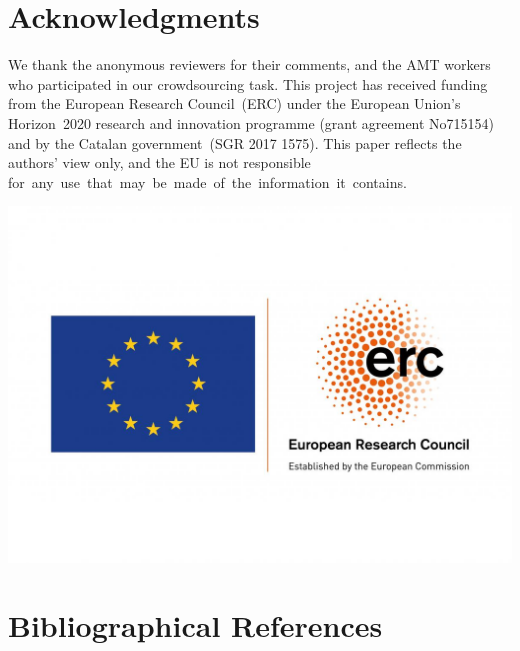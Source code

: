 \documentclass[10pt, a4paper]{article}
\begin{document}
\section{Acknowledgments}
We thank the anonymous reviewers for their comments, and the AMT workers who participated in our crowdsourcing task.  
 This project has received funding from the European Research Council~(ERC) under the European Union's Horizon~2020 research and innovation programme (grant agreement No715154) and by the Catalan government~(SGR 2017 1575).
 This paper reflects the authors' view only,  and the EU is not responsible \mbox{for any use that may be made of the information it contains.}
 \begin{flushright}
 	\vspace{-2ex}
 	\includegraphics[scale=.03]{figures/LOGO_ERC-FLAG_EU_.jpg}
 \end{flushright}
 

\section{Bibliographical References}
\label{main:ref}





\end{document}
